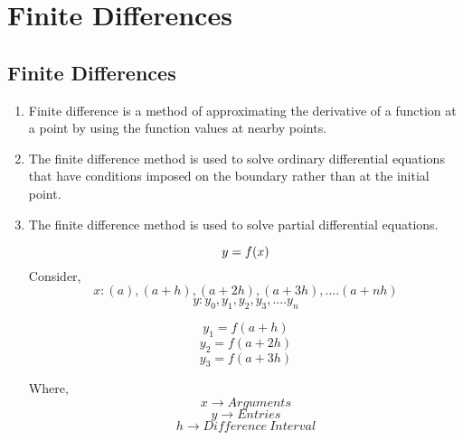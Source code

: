 \newpage

\chapter{Finite Differences}

\section{Finite Differences}

\begin{enumerate}
  \item Finite difference is a method of approximating the derivative of a function at a point by using the function values at nearby points.
  \item The finite difference method is used to solve ordinary differential equations that have conditions imposed on the boundary rather than at the initial point.
  \item The finite difference method is used to solve partial differential equations.


    \begin{equation*}
        y = f(x)\\
    \end{equation*}
    Consider,
    \[ x : (a), (a+h), (a+2h), (a+3h), .... (a+nh) \]
    \[y : y_0, y_1, y_2, y_3, .... y_n\]

        \[y_1 = f(a+h)\]
        \[y_2 = f(a+2h)\]
        \[y_3 = f(a+3h)\]
        \mybox[noteshift=0.5cm,colback=lime!40]{\[y_n = f(a+nh)\]}

        Where,\\
        \[x \rightarrow Arguments\]
        \[y \rightarrow Entries\]
        \[h \rightarrow Difference\ Interval\]
\end{enumerate}




